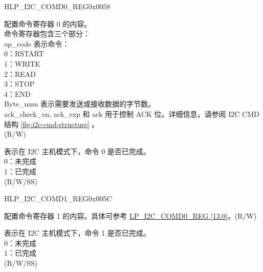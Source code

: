 \begin{register}{H}{LP\_I2C\_COMD0\_REG}{0x0058}\label{regdesc:LPI2CCOMD0REG}
%
%
%
\regnewline%
\begin{regdesc}\begin{reglist}
\label{fielddesc:LPI2CCOMMAND0}\item [LP\_I2C\_COMMAND0] 配置命令寄存器 0 的内容。 \\
命令寄存器包含三个部分：\\ 
op\_code 表示命令：\\
0：RSTART\\ 
1：WRITE\\
2：READ\\
3：STOP\\
4：END\\
Byte\_num 表示需要发送或接收数据的字节数。\\
ack\_check\_en, ack\_exp 和 ack 用于控制 ACK 位。详细信息，请参阅 I2C CMD 结构 \ref{fig:i2c-cmd-structure} 。\\(R/W)
\label{fielddesc:LPI2CCOMMAND0DONE}\item [LP\_I2C\_COMMAND0\_DONE] 表示在 I2C 主机模式下，命令 0 是否已完成。\\
0：未完成\\
1：已完成 \\ (R/W/SS)
\end{reglist}\end{regdesc}
\end{register}


\begin{register}{H}{LP\_I2C\_COMD1\_REG}{0x005C}\label{regdesc:LPI2CCOMD1REG}
%
%
%
\regnewline%
\begin{regdesc}\begin{reglist}
\label{fielddesc:LPI2CCOMMAND1}\item [LP\_I2C\_COMMAND1] 配置命令寄存器 1 的内容。具体可参考 \hyperref[regdesc:LPI2CCOMD0REG]{LP\_I2C\_COMD0\_REG [13:0]}。(R/W)
\label{fielddesc:LPI2CCOMMAND1DONE}\item [LP\_I2C\_COMMAND1\_DONE] 表示在 I2C 主机模式下，命令 1 是否已完成。\\
0：未完成\\
1：已完成 \\ (R/W/SS)
\end{reglist}\end{regdesc}
\end{register}


